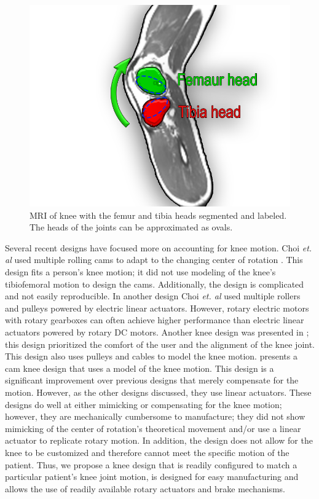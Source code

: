 \begin{figure}[h!]
    \centering
    \includegraphics[scale=0.5]{images/mech_design/MRI_knee_label.png}
    \caption[Labled MRI of knee]{MRI of knee with the femur and tibia heads segmented and labeled. The heads of the joints can be approximated as ovals. }
    \label{fig:MRIKnee}
\end{figure}

Several recent designs have focused more on accounting for knee motion. Choi \textit{et. al} used multiple rolling cams to adapt to the changing center of rotation \cite{choi2017development}. This design fits a person's knee motion; it did not use modeling of the knee's tibiofemoral motion to design the cams. Additionally, the design is complicated and not easily reproducible. In another design Choi \textit{et. al} used multiple rollers and pulleys powered by electric linear actuators. However, rotary electric motors with rotary gearboxes can often achieve higher performance than electric linear actuators powered by rotary DC motors. Another knee design was presented in \cite{wang2018comfort}; this design prioritized the comfort of the user and the alignment of the knee joint. This design also uses pulleys and cables to model the knee motion. \cite{AdaptiveKneeJoint} presents a cam knee design that uses a model of the knee motion. This design is a significant improvement over previous designs that merely compensate for the motion. However, as the other designs discussed, they use linear actuators. These designs do well at either mimicking or compensating for the knee motion; however, they are mechanically cumbersome to manufacture; they did not show mimicking of the center of rotation's theoretical movement and/or use a linear actuator to replicate rotary motion. In addition, the design does not allow for the knee to be customized and therefore cannot meet the specific motion of the patient. Thus, we propose a knee design that is readily configured to match a particular patient's knee joint motion, is designed for easy manufacturing and allows the use of readily available rotary actuators and brake mechanisms.

